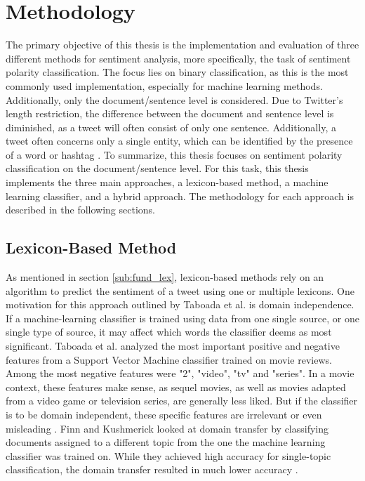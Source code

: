 \chapter{Methodology}
\label{cha:Chapter4_Methodology}
The primary objective of this thesis is the implementation and evaluation of three different methods for sentiment analysis, more specifically, the task of sentiment polarity classification. The focus lies on binary classification, as this is the most commonly used implementation, especially for machine learning methods. Additionally, only the document/sentence level is considered. Due to Twitter's length restriction, the difference between the document and sentence level is diminished, as a tweet will often consist of only one sentence. Additionally, a tweet often concerns only a single entity, which can be identified by the presence of a word or hashtag \cite{DBLP:journals/csur/GiachanouC16}. To summarize, this thesis focuses on sentiment polarity classification on the document/sentence level. For this task, this thesis implements the three main approaches, a lexicon-based method, a machine learning classifier, and a hybrid approach. The methodology for each approach is described in the following sections.

\section{Lexicon-Based Method}
As mentioned in section \ref{sub:fund_lex}, lexicon-based methods rely on an algorithm to predict the sentiment of a tweet using one or multiple lexicons. One motivation for this approach outlined by Taboada et al. is domain independence. If a machine-learning classifier is trained using data from one single source, or one single type of source, it may affect which words the classifier deems as most significant. Taboada et al. analyzed the most important positive and negative features from a Support Vector Machine classifier trained on movie reviews. Among the most negative features were "2", "video", "tv" and "series". In a movie context, these features make sense, as sequel movies, as well as movies adapted from a video game or television series, are generally less liked. But if the classifier is to be domain independent, these specific features are irrelevant or even misleading \cite{taboada}. Finn and Kushmerick looked at domain transfer by classifying documents assigned to a different topic from the one the machine learning classifier was trained on. While they achieved high accuracy for single-topic classification, the domain transfer resulted in much lower accuracy \cite{Finn03learningto}.

